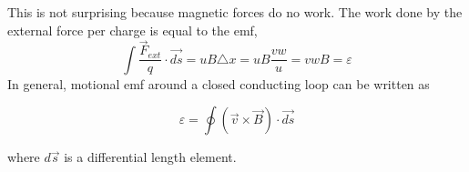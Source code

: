 \documentclass{article}
\begin{document}
This is not surprising because magnetic forces do no work. The work done by the external force per charge is equal to the emf,
\[ \int \dfrac{\vec{F}_{ext}}{q}\cdot \vec{ds} = uB\triangle x= uB\dfrac{vw}{u} =vwB = \varepsilon \]
In general, motional emf around a closed conducting loop can be written as

\[ \varepsilon =  \oint(\vec{v}\times \vec{B})\cdot \vec{ds} \]

where $ d\vec{s} $ is a differential length element.
\end{document}
